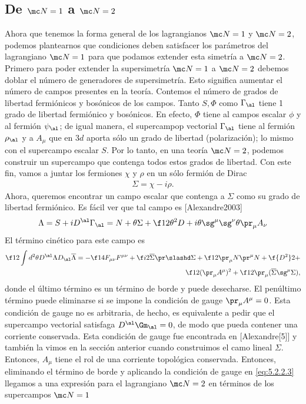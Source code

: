 \subsection{De $\mc N=1$ a $\mc N=2$}

Ahora que tenemos la forma general de los lagrangianos $\mc N=1$ y $\mc N=2$, podemos plantearnos que condiciones deben satisfacer los parámetros del lagrangiano $\mc N=1$ para que podamos extender esta simetría a $\mc N=2$.  Primero para poder extender la supersimetría $\mc N=1$ a $\mc N=2$ debemos doblar el número de generadores de supersimetría. Esto significa aumentar el número de campos presentes en la teoría. Contemos el número de grados de libertad fermiónicos y bosónicos de los campos. Tanto $S,\Phi$ como $\Gamma_\al$ tiene 1 grado de libertad fermiónico y bosónicos. En efecto, $\Phi$ tiene al campos escalar $\phi$ y al fermión $\psi_\al$; de igual manera, el supercampop vectorial $\Gamma_\al$ tiene al fermión $\rho_\al$ y a $A_\mu$ que en $3d$ aporta sólo un grado de libertad (polarización); lo mismo con el supercampo escalar $S$. Por lo tanto, en una teoría $\mc N=2$, podemos construir un supercampo que contenga todos estos grados de libertad. Con este fin, vamos a juntar los fermiones $\chi$ y $\rho$ en un sólo fermión de Dirac
\begin{align}
	\Sigma = \chi-i\rho.
\end{align}
Ahora, queremos encontrar un campo escalar que contenga a $\Sigma$ como su grado de libertad fermiónico. Es fácil ver que tal campo es [Alexandre2003]
\begin{align}
	\Lambda = S+iD^\al \Gamma_\al = N+\theta\Sigma+\f 12\theta^2 D+i\theta\sg^\mu\sg^\nu\theta\pr_\mu A_\nu
\end{align}
El término cinético para este campo es
\begin{align}
	\f 12\int d^2\theta D^\al\Lambda D_\al\overline\Lambda = -\f 14 F_{\mu\nu}F^{\mu\nu}+\f i2\overline\Sigma\pr\slashd\Sigma+\f 12\pr_\mu N\pr^\mu N+\f{D^2}2+\nonumber\\
	\f 12(\pr_\mu A^\mu)^2+\f 12\pr_\mu(\overline\Sigma\sg^\mu\Sigma),\label{eq:5.2.2.3}
\end{align}
donde el último término es un término de borde y puede desecharse. El penúltimo término puede eliminarse si se impone la condición de gauge $\pr_\mu A^\mu=0$. Esta condición de gauge no es arbitraria, de hecho, es equivalente a pedir que el supercampo vectorial satisfaga $D^\al\Gm_\al=0$, de modo que pueda contener una corriente conservada. Esta condición de gauge fue encontrada en [Alexandre[5]] y también la vimos en la sección anterior cuando construimos el camo lineal $\Sigma$. Entonces, $A_\mu$ tiene el rol de una corriente topológica conservada. Entonces, eliminando el término de borde y aplicando la condición de gauge en \eqref{eq:5.2.2.3} llegamos a una expresión para el lagrangiano $\mc N=2$ en términos de los supercampos $\mc N=1$
